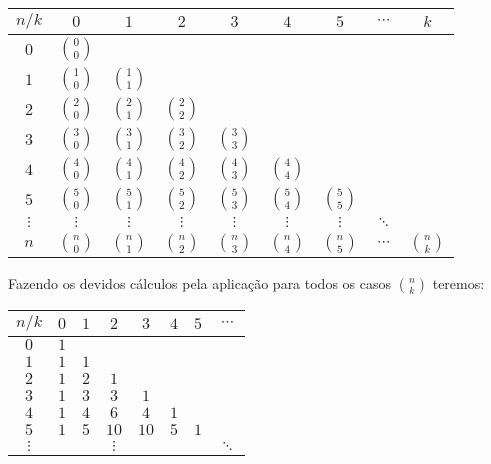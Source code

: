 \documentclass[a4paper,11pt,oneside]{book}
\theoremstyle{definition}
\theoremstyle{break}
\begin{document}
\begin{center}
\begin{tabular}{ | c | c c c c c c c c | }
\hline
  $n/k$ &$0$& $1$ & $2$ & $3$ & $4$ & $5$ & $\cdots$ & $k$ \\
\hline
$0$     & \tiny $0 \choose 0$ &               &               &               &               &              &         & \\
$1$     & \tiny $1 \choose 0$ & \tiny $1 \choose 1$ &               &               &               &              &         & \\
$2$     & \tiny $2 \choose 0$ & \tiny $2 \choose 1$ & \tiny $2 \choose 2$ &               &               &              &         & \\
$3$     & \tiny $3 \choose 0$ & \tiny $3 \choose 1$ & \tiny $3 \choose 2$ & \tiny $3 \choose 3$ &               &              &         & \\
$4$     & \tiny $4 \choose 0$ & \tiny $4 \choose 1$ & \tiny $4 \choose 2$ & \tiny $4 \choose 3$ & \tiny $4 \choose 4$ &              &         & \\
$5$     & \tiny $5 \choose 0$ & \tiny $5 \choose 1$ & \tiny $5 \choose 2$ & \tiny $5 \choose 3$ & \tiny $5 \choose 4$ & \tiny $5 \choose 5$&         & \\
$\vdots$&\tiny $\vdots$       &\tiny $\vdots$       &\tiny $\vdots$       &\tiny $\vdots$       &\tiny $\vdots$       &\tiny $\vdots$      &\tiny $\ddots$ & \\
$n$     & \tiny $n \choose 0$ & \tiny $n \choose 1$ & \tiny $n \choose 2$ & \tiny $n \choose 3$ & \tiny $n \choose 4$ & \tiny $n \choose 5$&\tiny $\cdots$ & \tiny $n \choose k$\\
\hline

\end{tabular}
\end{center}
Fazendo os devidos cálculos pela aplicação para todos os casos ${n \choose k}$ teremos:
\begin{center}
\begin{tabular}{ | c | c c c c c c c | }
\hline
 $n/k$ &$0$& $1$ & $2$ & $3$ & $4$ & $5$ & $\cdots$  \\
\hline
$0$     & $1$ &     &        &      &     &     & \\
$1$     & $1$ & $1$ &        &      &     &     & \\
$2$     & $1$ & $2$ & $1$    &      &     &     & \\
$3$     & $1$ & $3$ & $3$    & $1$  &     &     & \\
$4$     & $1$ & $4$ & $6$    & $4$  & $1$ &     & \\
$5$     & $1$ & $5$ & $10$   & $10$ & $5$ & $1$ & \\
$\vdots$&     &     &$\vdots$&      &     &     & $\ddots$ 
\end{tabular}
\end{center}
\end{document}
